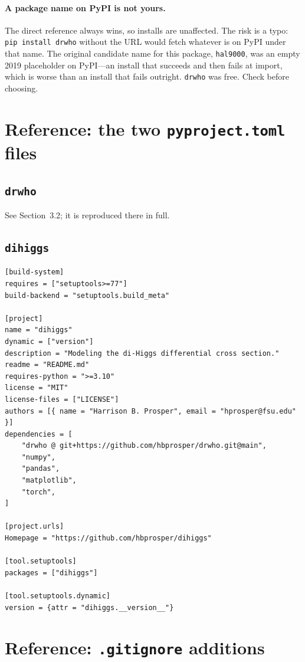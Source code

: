 \documentclass[11pt,a4paper]{article}
\begin{document}
\paragraph{A package name on PyPI is not yours.}
The direct reference always wins, so installs are unaffected. The risk is a typo:
\texttt{pip install drwho} without the URL would fetch whatever is on PyPI under
that name. The original candidate name for this package, \texttt{hal9000}, was an
empty 2019 placeholder on PyPI---an install that succeeds and then fails at
import, which is worse than an install that fails outright. \texttt{drwho} was
free. Check before choosing.

\appendix
\section{Reference: the two \texttt{pyproject.toml} files}

\subsection{\texttt{drwho}}
See Section~3.2; it is reproduced there in full.

\subsection{\texttt{dihiggs}}

\begin{lstlisting}[style=tomlst]
[build-system]
requires = ["setuptools>=77"]
build-backend = "setuptools.build_meta"

[project]
name = "dihiggs"
dynamic = ["version"]
description = "Modeling the di-Higgs differential cross section."
readme = "README.md"
requires-python = ">=3.10"
license = "MIT"
license-files = ["LICENSE"]
authors = [{ name = "Harrison B. Prosper", email = "hprosper@fsu.edu" }]
dependencies = [
    "drwho @ git+https://github.com/hbprosper/drwho.git@main",
    "numpy",
    "pandas",
    "matplotlib",
    "torch",
]

[project.urls]
Homepage = "https://github.com/hbprosper/dihiggs"

[tool.setuptools]
packages = ["dihiggs"]

[tool.setuptools.dynamic]
version = {attr = "dihiggs.__version__"}
\end{lstlisting}

\section{Reference: \texttt{.gitignore} additions}
\end{document}

